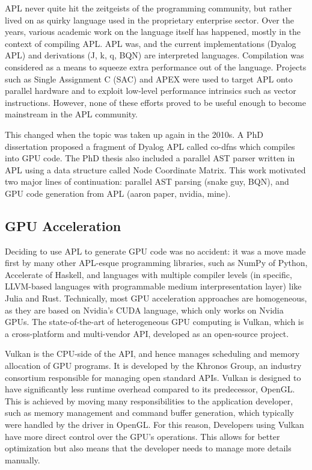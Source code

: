 \documentclass[10pt,a4paper]{article}
\begin{document}
APL never quite hit the zeitgeists of the programming community, but rather lived on as quirky language used in the proprietary enterprise sector. 
Over the years, various academic work on the language itself has happened, mostly in the context of compiling APL. 
APL was, and the current implementations (Dyalog APL) and derivations (J, k, q, BQN) are interpreted languages. 
Compilation was considered as a means to squeeze extra performance out of the language. 
Projects such as Single Assignment C (SAC) and APEX were used to target APL onto parallel hardware and to exploit low-level performance intrinsics such as vector instructions. 
However, none of these efforts proved to be useful enough to become mainstream in the APL community.

This changed when the topic was taken up again in the 2010s. A PhD dissertation proposed a fragment of Dyalog APL called co-dfns which compiles into GPU code.
The PhD thesis also included a parallel AST parser written in APL using a data structure called Node Coordinate Matrix.
This work motivated two major lines of continuation: parallel AST parsing (snake guy, BQN), and GPU code generation from APL (aaron paper, nvidia, mine).

\subsection{GPU Acceleration}

Deciding to use APL to generate GPU code was no accident: it was a move made first by many other APL-esque programming libraries, such as NumPy of Python, Accelerate of Haskell, and languages with multiple compiler levels (in specific, LLVM-based languages with programmable medium interpresentation layer) like Julia and Rust.
Technically, most GPU acceleration approaches are homogeneous, as they are based on Nvidia's CUDA language, which only works on Nvidia GPUs.
The state-of-the-art of heterogeneous GPU computing is Vulkan, which is a cross-platform and multi-vendor API, developed as an open-source project.

Vulkan is the CPU-side of the API, and hence manages scheduling and memory allocation of GPU programs.
It is developed by the Khronos Group, an industry consortium responsible for managing open standard APIs.
Vulkan is designed to have significantly less runtime overhead compared to its predecessor, OpenGL.
This is achieved by moving many responsibilities to the application developer, such as memory management and command buffer generation, which typically were handled by the driver in OpenGL.
For this reason, Developers using Vulkan have more direct control over the GPU's operations. This allows for better optimization but also means that the developer needs to manage more details manually.
\end{document}

